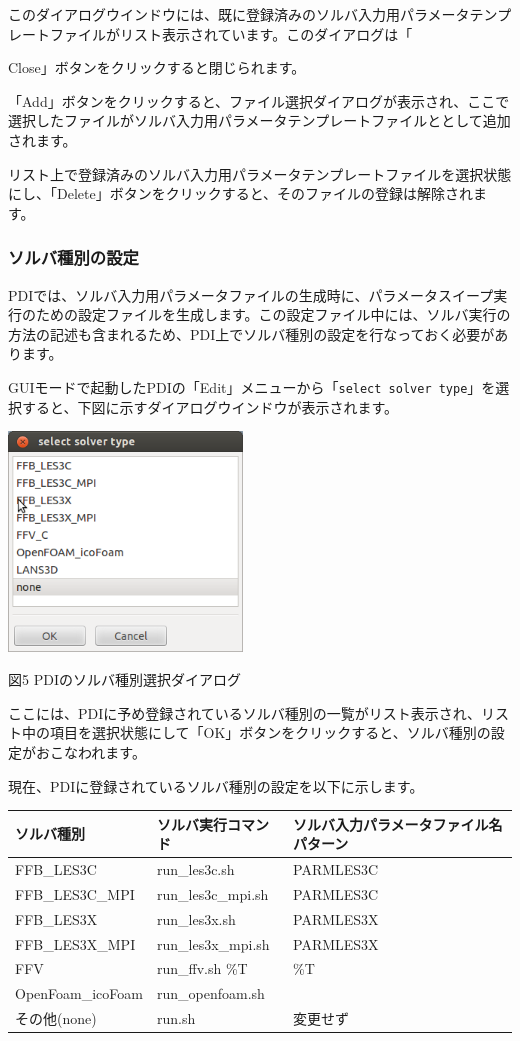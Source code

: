 \documentclass[a4paper,11pt]{jarticle}
\begin{document}
このダイアログウインドウには、既に登録済みのソルバ入力用パラメータテンプレートファイルがリスト表示されています。このダイアログは「{Close」ボタンをクリックすると閉じられます。

「Add」ボタンをクリックすると、ファイル選択ダイアログが表示され、ここで選択したファイルがソルバ入力用パラメータテンプレートファイルととして追加されます。

リスト上で登録済みのソルバ入力用パラメータテンプレートファイルを選択状態にし、「Delete」ボタンをクリックすると、そのファイルの登録は解除されます。


\subsubsection{ソルバ種別の設定}

PDIでは、ソルバ入力用パラメータファイルの生成時に、パラメータスイープ実行のための設定ファイルを生成します。この設定ファイル中には、ソルバ実行の方法の記述も含まれるため、PDI上でソルバ種別の設定を行なっておく必要があります。

GUIモードで起動したPDIの「Edit」メニューから「{\tt select solver type}」を選択すると、下図に示すダイアログウインドウが表示されます。

\begin{center}
\includegraphics[width=176pt, bb=0 0 312 296]{figs/fig004.png}

図5 PDIのソルバ種別選択ダイアログ
\end{center}

ここには、PDIに予め登録されているソルバ種別の一覧がリスト表示され、リスト中の項目を選択状態にして「OK」ボタンをクリックすると、ソルバ種別の設定がおこなわれます。

現在、PDIに登録されているソルバ種別の設定を以下に示します。

\begin{tt}
\begin{tabular}{|l|l|l|}
\hline
ソルバ種別 & ソルバ実行コマンド & ソルバ入力パラメータファイル名パターン\tabularnewline
\hline
FFB\_LES3C & run\_les3c.sh & PARMLES3C\tabularnewline
\hline
FFB\_LES3C\_MPI & run\_les3c\_mpi.sh & PARMLES3C\tabularnewline
\hline
FFB\_LES3X & run\_les3x.sh & PARMLES3X\tabularnewline
\hline
FFB\_LES3X\_MPI & run\_les3x\_mpi.sh & PARMLES3X\tabularnewline
\hline
FFV & run\_ffv.sh \%T & \%T \tabularnewline
\hline
OpenFoam\_icoFoam & run\_openfoam.sh &  \tabularnewline
\hline
その他(none) & run.sh & 変更せず\tabularnewline
\hline
\end{tabular}
\end{tt}

}
\end{document}
